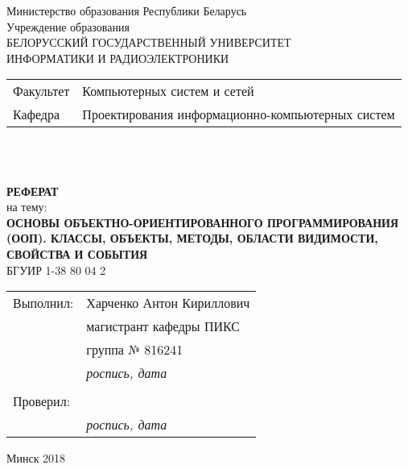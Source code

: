 \begin{titlepage}
  \begin{center}
    Министерство образования Республики Беларусь\\[1em]
    Учреждение образования\\
    БЕЛОРУССКИЙ ГОСУДАРСТВЕННЫЙ УНИВЕРСИТЕТ \\
    ИНФОРМАТИКИ И РАДИОЭЛЕКТРОНИКИ\\[1em]

    \begin{minipage}{\textwidth}
      \begin{flushleft}
        \begin{tabular}{ l l }
          Факультет & Компьютерных систем и сетей\\
          Кафедра   & Проектирования информационно-компьютерных систем
        \end{tabular}
      \end{flushleft}
    \end{minipage}\\[3em]

	\begin{minipage}{0.4\textwidth}
		
	\end{minipage}\\[2.2em]

    \textbf{РЕФЕРАТ}\\
    {на тему:}\\[1em]
    \textbf{\large\MakeUppercase{Основы объектно-ориентированного программирования (ООП). Классы, объекты, методы, области видимости, свойства и события}}\\[1em]

    {БГУИР 1-38 80 04 2}\\[2em]
    
    \begin{flushright}
      \begin{tabular}{ l l }
        Выполнил: & Харченко Антон Кириллович\\
        & магистрант кафедры ПИКС\\
        & группа № 816241\\
        & \underline{\hspace*{2.8cm}} \textit{роспись, дата}\\
        & \\
        Проверил: & \\
        & \underline{\hspace*{2.8cm}} \textit{роспись, дата}\\
      \end{tabular}
    \end{flushright}
    
    \vfill
    {\normalsize Минск 2018}
  \end{center}
\end{titlepage}
